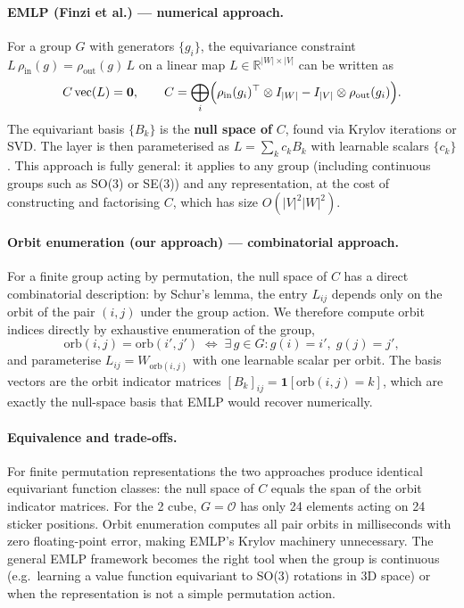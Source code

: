 \documentclass[11pt]{article}
\newcommand{\R}{\mathbb{R}}
\begin{document}
\paragraph{EMLP (Finzi et al.) — numerical approach.}
For a group $G$ with generators $\{g_i\}$, the equivariance constraint
$L\,\rho_\text{in}(g) = \rho_\text{out}(g)\,L$ on a linear map
$L \in \R^{|W| \times |V|}$ can be written as
\begin{equation}
  C\,\mathrm{vec}(L) = \mathbf{0},
  \qquad
  C = \bigoplus_i
  \Bigl(\rho_\text{in}(g_i)^\top \otimes I_{|W|}
        - I_{|V|} \otimes \rho_\text{out}(g_i)\Bigr).
  \label{eq:emlp_constraint}
\end{equation}
The equivariant basis $\{B_k\}$ is the \textbf{null space of} $C$,
found via Krylov iterations or SVD.
The layer is then parameterised as $L = \sum_k c_k B_k$ with learnable
scalars $\{c_k\}$.
This approach is fully general: it applies to any group (including
continuous groups such as SO(3) or SE(3)) and any representation, at the
cost of constructing and factorising $C$, which has size
$O(|V|^2 |W|^2)$.

\paragraph{Orbit enumeration (our approach) — combinatorial approach.}
For a finite group acting by permutation, the null space of
$C$ has a direct combinatorial description: by Schur's lemma, the entry
$L_{ij}$ depends only on the orbit of the pair $(i,j)$ under the group
action.
We therefore compute orbit indices directly by exhaustive enumeration
of the group,
\begin{equation}
  \mathrm{orb}(i,j) = \mathrm{orb}(i',j')
  \;\iff\;
  \exists\, g \in G : g(i)=i',\; g(j)=j',
  \label{eq:orbit_enum}
\end{equation}
and parameterise $L_{ij} = W_{\mathrm{orb}(i,j)}$ with one learnable
scalar per orbit.
The basis vectors are the orbit indicator matrices
$[B_k]_{ij} = \mathbf{1}[\mathrm{orb}(i,j)=k]$, which are exactly the
null-space basis that EMLP would recover numerically.

\paragraph{Equivalence and trade-offs.}
For finite permutation representations the two approaches produce
identical equivariant function classes: the null space of $C$
equals the span of the orbit indicator matrices.
For the 2 cube, $G = \mathcal{O}$ has only 24 elements
acting on 24 sticker positions.
Orbit enumeration computes all pair orbits in milliseconds with zero
floating-point error, making EMLP's Krylov machinery unnecessary.
The general EMLP framework becomes the right tool when the group is
continuous (e.g.\ learning a value function equivariant to SO(3) rotations
in 3D space) or when the representation is not a simple permutation action.
\end{document}
